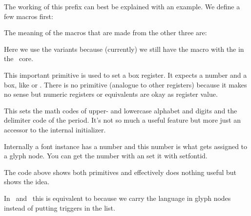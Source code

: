 \edef\TestG{\expanded    {\TestA\TestB\TestC}}
\edef\TestH{\semiexpanded{\TestA\TestB\TestC}}
\stopbuffer

The working of this prefix can best be explained with an example. We define a few
macros first:

\typebuffer \getbuffer

The meaning of the macros that are made from the other three are:

\startbuffer
\meaningless\TestD
\meaningless\TestE
\meaningless\TestF
\meaningless\TestG
\meaningless\TestH
\stopbuffer

Here we use the  variants because (currently) we still have the
macro with the \type {\expanded} in the \CONTEXT\ core.

\startlines \tttf \getbuffer \stoplines

\stopnewprimitive

\startoldprimitive[title={\prm {setbox}}]

This important primitive is used to set a box register. It expects a number and a
box, like  or . There is no \type {\boxdef} primitive
(analogue to other registers) because it makes no sense but numeric registers or
equivalents are okay as register value.

\stopoldprimitive

\startnewprimitive[title={\prm {setdefaultmathcodes}}]

This sets the math codes of upper- and lowercase alphabet and digits and the
delimiter code of the period. It's not so much a useful feature but more just an
accessor to the internal initializer.

\stopnewprimitive

\startnewprimitive[title={\prm {setfontid}}]

Internally a font instance has a number and this number is what gets assigned to
a glyph node. You can get the number with  an set it with \prm
{setfontid}.

\starttyping
\setfontid\fontid\font
\stoptyping

The code above shows both primitives and effectively does nothing useful but
shows the idea.

\stopnewprimitive

\startoldprimitive[title={\prm {setlanguage}}]

In \LUATEX\ and \LUAMETATEX\ this is equivalent to  because we
carry the language in glyph nodes instead of putting triggers in the list.

